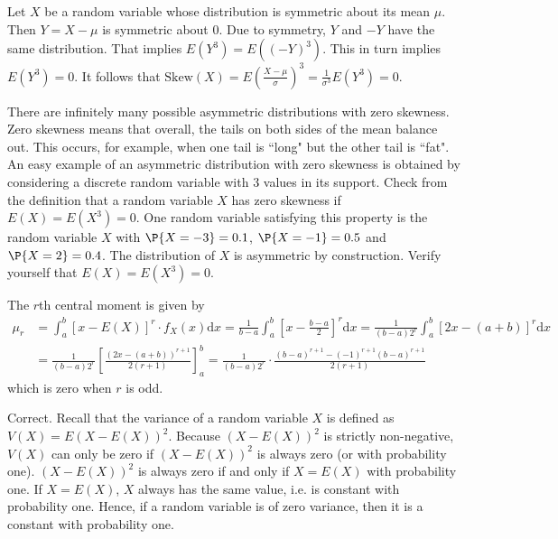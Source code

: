 \begin{Solution}{1.6}
			Let $X$ be a random variable whose distribution is symmetric about its mean $\mu$. Then $Y = X - \mu$ is symmetric about 0. Due to symmetry, $Y$ and $-Y$ have the same distribution. That implies $E(Y^3) = E((-Y)^3)$. This in turn implies $E(Y^3) = 0$. It follows that $\text{Skew}(X) = E\left(\frac{X - \mu}{\sigma}\right)^3 = \frac{1}{\sigma^3} E(Y^3) = 0$.
		
\end{Solution}
\begin{Solution}{1.7}
			There are infinitely many possible asymmetric distributions with zero skewness. Zero skewness means that overall, the tails on both sides of the mean balance out. This occurs, for example, when one tail is ``long" but the other tail is ``fat". An easy example of an asymmetric distribution with zero skewness is obtained by considering a discrete random variable with 3 values in its support. Check from the definition that a random variable $X$ has zero skewness if $E(X) = E(X^3) = 0$. One random variable satisfying this property is the random variable $X$ with $\P{X = -3} = 0.1$, $\P{X = -1} = 0.5$ and $\P{X = 2} = 0.4$. The distribution of $X$ is asymmetric by construction. Verify yourself that $E(X) = E(X^3) = 0$.
		
\end{Solution}
\begin{Solution}{1.8}
			The $r$th central moment is given by
			\begin{align*}
				\mu_r & = \int_a^b \left[x - E(X)\right]^r \cdot f_X(x) \mathrm{d}x = \frac{1}{b - a} \int_a^b \left[x - \frac{b - a}{2}\right]^r \mathrm{d}x = \frac{1}{(b - a) 2^r} \int_a^b \left[2x - (a + b)\right]^r \mathrm{d}x \\
				&= \frac{1}{(b - a) 2^r} \left[\frac{(2x - (a + b))^{r + 1}}{2(r + 1)}\right]_a^b = \frac{1}{(b - a) 2^r} \cdot \frac{(b - a)^{r + 1} - (-1)^{r + 1} (b - a)^{r + 1}}{2(r + 1)}
			\end{align*}
			which is zero when $r$ is odd.
		
\end{Solution}
\begin{Solution}{1.9}
			Correct. Recall that the variance of a random variable $X$ is defined as $V(X) = E(X - E(X))^2$. Because $(X - E(X))^2$ is strictly non-negative, $V(X)$ can only be zero if $(X - E(X))^2$ is always zero (or with probability one). $(X - E(X))^2$ is always zero if and only if $X = E(X)$ with probability one. If $X = E(X)$, $X$ always has the same value, i.e. is constant with probability one. Hence, if a random variable is of zero variance, then it is a constant with probability one.
		
\end{Solution}
